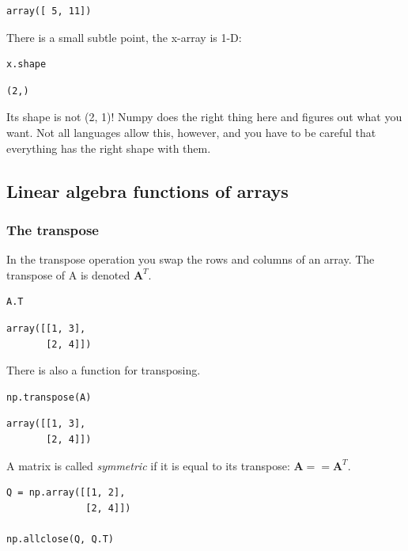 \documentclass[11pt]{article}
\begin{document}
\begin{verbatim}
array([ 5, 11])
\end{verbatim}

There is a small subtle point, the x-array is 1-D:

\begin{verbatim}
x.shape
\end{verbatim}

\begin{verbatim}
(2,)
\end{verbatim}

Its shape is not (2, 1)! Numpy does the right thing here and figures out what you want. Not all languages allow this, however, and you have to be careful that everything has the right shape with them.


\subsection{Linear algebra functions of arrays}
\label{sec:orga0572e4}

\subsubsection{The transpose}
\label{sec:orgbd48316}

In the transpose operation you swap the rows and columns of an array. The transpose of A is denoted \(\mathbf{A}^T\).

\begin{verbatim}
A.T
\end{verbatim}

\begin{verbatim}
array([[1, 3],
       [2, 4]])
\end{verbatim}

There is also a function for transposing.

\begin{verbatim}
np.transpose(A)
\end{verbatim}

\begin{verbatim}
array([[1, 3],
       [2, 4]])
\end{verbatim}

A matrix is called \emph{symmetric} if it is equal to its transpose: \(\mathbf{A} == \mathbf{A}^T\).

\begin{verbatim}
Q = np.array([[1, 2],
              [2, 4]])

np.allclose(Q, Q.T)
\end{verbatim}
\end{document}
